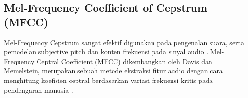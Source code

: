 \subsection{Mel-Frequency Coefficient of Cepstrum (MFCC)}
Mel-Frequency Cepstrum sangat efektif digunakan pada pengenalan suara, serta pemodelan subjective pitch dan konten frekuensi pada sinyal audio \citep{hmmaudio}. Mel-Frequency Ceptral Coefficient (MFCC) dikembangkan oleh Davis dan Memelstein, merupakan sebuah metode ekstraksi fitur audio dengan cara menghitung koefisien ceptral berdasarkan variasi frekuensi kritis pada pendengaran manusia \citep{Widodo2017PenerapanMM}.